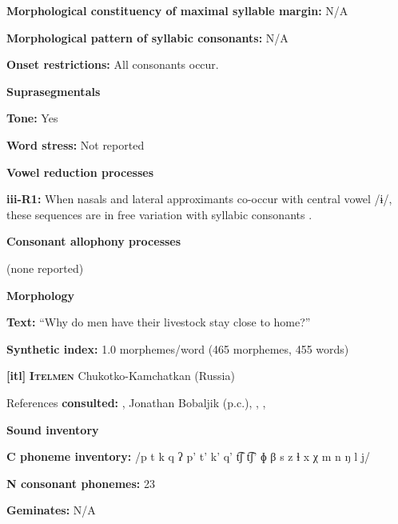 \textbf{Morphological constituency of maximal syllable margin:} N/A



\textbf{Morphological pattern of syllabic consonants:} N/A



\textbf{Onset restrictions:} All consonants occur.



\textbf{Suprasegmentals}



\textbf{Tone:} Yes



\textbf{Word stress:} Not reported



\textbf{Vowel reduction processes}



\textbf{iii-R1:} When nasals and lateral approximants co-occur with central vowel /ɨ/, these sequences are in free variation with syllabic consonants \citep[31]{Gerner2013}.



\textbf{Consonant allophony processes}



(none reported)



\textbf{Morphology}



\textbf{Text:} “Why do men have their livestock stay close to home?” \citep[525-530]{Gerner2013}



\textbf{Synthetic index:} 1.0 morphemes/word (465 morphemes, 455 words)



\textbf{[itl]}   \textbf{\textsc{Itelmen}}  Chukotko-Kamchatkan (Russia)



References \textbf{consulted:} \citet{Bobaljik2006}, Jonathan Bobaljik (p.c.), \citet{GeorgVolodin1999}, \citet{Volodin1976}, \citet{VolodinZhukova1968}



\textbf{Sound inventory}



\textbf{C phoneme inventory:} /p t k q ʔ p’ t’ k’ q’ t͡ʃ t͡ʃ’ ɸ β s z ɬ x χ m n ŋ l j/



\textbf{N consonant phonemes:} 23



\textbf{Geminates:} N/A



